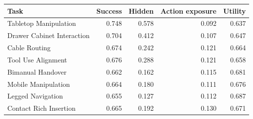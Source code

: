 \begin{tabular}{lrrrr}
\toprule
Task & Success & Hidden & Action exposure & Utility \\
\midrule
Tabletop Manipulation & 0.748 & 0.578 & 0.092 & 0.637 \\
Drawer Cabinet Interaction & 0.704 & 0.412 & 0.107 & 0.647 \\
Cable Routing & 0.674 & 0.242 & 0.121 & 0.664 \\
Tool Use Alignment & 0.676 & 0.288 & 0.121 & 0.658 \\
Bimanual Handover & 0.662 & 0.162 & 0.115 & 0.681 \\
Mobile Manipulation & 0.664 & 0.180 & 0.111 & 0.676 \\
Legged Navigation & 0.655 & 0.127 & 0.112 & 0.687 \\
Contact Rich Insertion & 0.665 & 0.192 & 0.130 & 0.671 \\
\bottomrule
\end{tabular}

